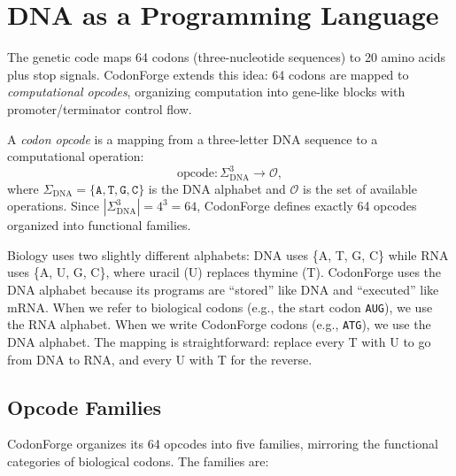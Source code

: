 \section{DNA as a Programming Language}
\label{sec:dna-programming}

The genetic code maps 64 codons (three-nucleotide sequences) to 20 amino acids plus stop signals. CodonForge extends this idea: 64 codons are mapped to \emph{computational opcodes}, organizing computation into gene-like blocks with promoter/terminator control flow.

\begin{definition}
\label{def:codon-opcode}
A \emph{codon opcode} is a mapping from a three-letter DNA sequence to a computational operation:
\begin{equation}
\text{opcode} : \Sigma_{\text{DNA}}^3 \to \mathcal{O},
\end{equation}
where $\Sigma_{\text{DNA}} = \{\texttt{A}, \texttt{T}, \texttt{G}, \texttt{C}\}$ is the DNA alphabet and $\mathcal{O}$ is the set of available operations. Since $|\Sigma_{\text{DNA}}^3| = 4^3 = 64$, CodonForge defines exactly 64 opcodes organized into functional families.
\end{definition}

\begin{bioinsight}
Biology uses two slightly different alphabets: DNA uses \{A, T, G, C\} while RNA uses \{A, U, G, C\}, where uracil (U) replaces thymine (T). CodonForge uses the DNA alphabet because its programs are ``stored'' like DNA and ``executed'' like mRNA. When we refer to biological codons (e.g., the start codon \texttt{AUG}), we use the RNA alphabet. When we write CodonForge codons (e.g., \texttt{ATG}), we use the DNA alphabet. The mapping is straightforward: replace every T with U to go from DNA to RNA, and every U with T for the reverse.
\end{bioinsight}

\subsection{Opcode Families}
\label{subsec:opcode-families}

CodonForge organizes its 64 opcodes into five families, mirroring the functional categories of biological codons. The families are:

